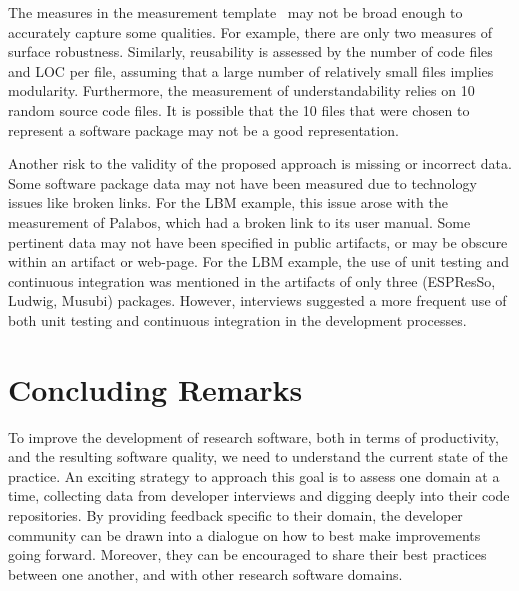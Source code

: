 \documentclass[runningheads]{llncs}
\begin{document}
The measures in the measurement template~\cite{SmithEtAl2021} may not be broad
enough to accurately capture some qualities. For example, there are only two
measures of surface robustness. Similarly, reusability is assessed by the number
of code files and LOC per file, assuming that a large number of relatively small
files implies modularity. Furthermore, the measurement of understandability
relies on 10 random source code files. It is possible that the 10 files that
were chosen to represent a software package may not be a good representation.

Another risk to the validity of the proposed approach is missing or incorrect
data. Some software package data may not have been measured due to technology
issues like broken links. For the LBM example, this issue arose with the
measurement of Palabos, which had a broken link to its user manual. Some
pertinent data may not have been specified in public artifacts, or may be
obscure within an artifact or web-page. For the LBM example, the use of unit
testing and continuous integration was mentioned in the artifacts of only three
(ESPResSo, Ludwig, Musubi) packages. However, interviews suggested a more
frequent use of both unit testing and continuous integration in the development
processes.

\section{Concluding Remarks} \label{SecConcludingRemarks}

To improve the development of research software, both in terms of productivity,
and the resulting software quality, we need to understand the current state of
the practice. An exciting strategy to approach this goal is to assess one domain
at a time, collecting data from developer interviews and digging deeply into
their code repositories. By providing feedback specific to their domain, the
developer community can be drawn into a dialogue on how to best make
improvements going forward. Moreover, they can be encouraged to share their best
practices between one another, and with other research software domains.
\end{document}
